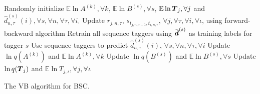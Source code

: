 \begin{algorithm}
\DontPrintSemicolon
 \nl Randomly initialize $\mathbb{E}\ln A^{(k)},\forall k$,
 $\mathbb{E}\ln B^{(s)},\forall s$, $\mathbb{E}\ln \boldsymbol T_j,\forall j$ 
 and $\hat{d}^{(s)}_{n,\tau}(i), \forall s,\forall n,\forall \tau,\forall i$.\;
 {
 \nl Update $r_{j,n,\tau}$, $s_{t_{j,n,\tau\!-\!1}, t_{\iota,n,\tau}}$, $\forall j,\forall \tau,\forall i,\forall \iota$,
 using forward-backward algorithm\;%
 \nl Retrain all sequence taggers using $\tilde{\boldsymbol d}^{(s)}$ as training labels for tagger $s$\;
 \nl Use sequence taggers to predict $\hat{d}^{(s)}_{n,\tau}(i)$, $\forall s,\forall n,\forall \tau,\forall i$\;
 \nl Update $\ln q(A^{(k)})$ and $\mathbb{E}\ln A^{(k)},\forall k$ \;%
 \nl Update $\ln q(B^{(s)})$ and $\mathbb{E}\ln B^{(s)},\forall s$ \;%
 \nl Update $\ln q(\boldsymbol T_j)$ and $\mathbb{E}\ln T_{j,\iota},\forall j,\forall \iota$ \;%
 }
\;
\caption{The VB algorithm for BSC.}
\label{al:vb_bac}
\end{algorithm}

